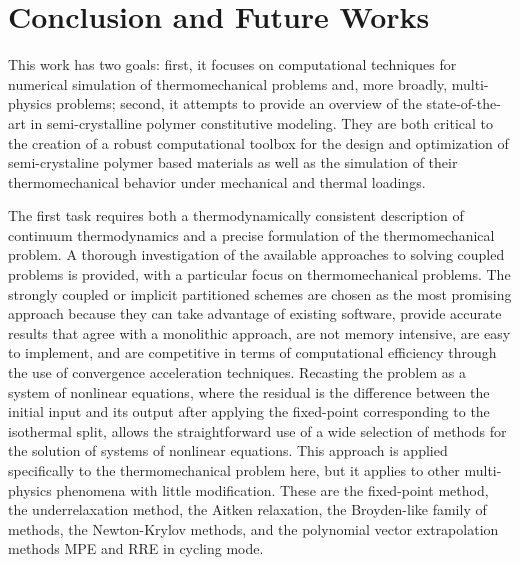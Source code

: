 \chapter{Conclusion and Future Works} \label{ch:conclusions}

This work has two goals: first, it focuses on computational techniques for numerical simulation of thermomechanical problems and, more broadly, multi-physics problems; second, it attempts to provide an overview of the state-of-the-art in semi-crystalline polymer constitutive modeling.
They are both critical to the creation of a robust computational toolbox for the design and optimization of semi-crystaline polymer based materials as well as the simulation of their thermomechanical behavior under mechanical and thermal loadings.

The first task requires both a thermodynamically consistent description of continuum thermodynamics and a precise formulation of the thermomechanical problem.
A thorough investigation of the available approaches to solving coupled problems is provided, with a particular focus on thermomechanical problems.
The strongly coupled or implicit partitioned schemes are chosen as the most promising approach because they can take advantage of existing software, provide accurate results that agree with a monolithic approach, are not memory intensive, are easy to implement, and are competitive in terms of computational efficiency through the use of convergence acceleration techniques.
Recasting the problem as a system of nonlinear equations, where the residual is the difference between the initial input and its output after applying the fixed-point corresponding to the isothermal split, allows the straightforward use of a wide selection of methods for the solution of systems of nonlinear equations.
This approach is applied specifically to the thermomechanical problem here, but it applies to other multi-physics phenomena with little modification.
These are the fixed-point method, the underrelaxation method, the Aitken relaxation, the Broyden-like family of methods, the Newton-Krylov methods, and the polynomial vector extrapolation methods MPE and RRE in cycling mode.

